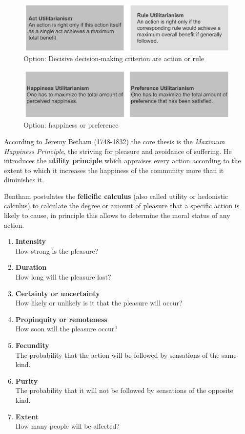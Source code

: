 \documentclass[11pt]{article}
\theoremstyle{definition}
\begin{document}
\begin{figure}[tbh]
	\centering
	\includegraphics[width=0.8\linewidth]{img/act-rule-utilitarianism}
	\caption{Option: Decisive decision-making criterion are action or rule}
	\label{fig:act-rule-utilitarianism}
\end{figure}

\begin{figure}[tbh]
	\centering
	\includegraphics[width=0.8\linewidth]{img/happiness-preference-utilitarianism}
	\caption{Option: happiness or preference}
	\label{fig:happiness-preference-utilitarianism}
\end{figure}

According to Jeremy Betham (1748-1832) the core thesis is the \textit{Maximum Happiness Principle}, the striving for pleasure and avoidance of suffering. He introduces the \textbf{utility principle} which appraises every action according to the extent to which it increases the happiness of the community more than it diminishes it.

\clearpage
Bentham postulates the \textbf{felicific calculus} (also called utility or hedonistic calculus) to calculate the degree or amount of pleasure that a specific action is likely to cause, in principle this allows to determine the moral status of any action.
\begin{enumerate}[nosep]
	\item \textbf{Intensity}\\
	How strong is the pleasure?
	\item \textbf{Duration}\\
	How long will the pleasure last?
	\item \textbf{Certainty or uncertainty}\\
	How likely or unlikely is it that the pleasure will occur?
	\item \textbf{Propinquity or remoteness}\\
	How soon will the pleasure occur?
	\item \textbf{Fecundity}\\
	The probability that the action will be followed by sensations of the same kind.
	\item \textbf{Purity}\\
	The probability that it will not be followed by sensations of the opposite kind.
	\item \textbf{Extent}\\
	How many people will be affected?
\end{enumerate}
\end{document}
